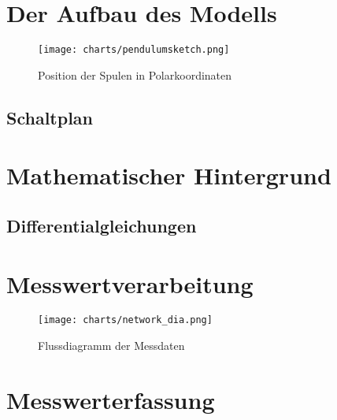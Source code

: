\documentclass[a4paper]{article}
\title{\mytitle}
\author{\myauthor}
\begin{document}
\maketitle
\begin{abstract}
In unserem Projekt beschäftigen wir uns mit dem Verhalten von chaotischen Doppelpendeln. Wir wollen aus der aktuellen Bewegung eines Doppelpendels den weiteren Bewegungsablauf in einem kurzen Zeitintervall extrapolieren und dann versuchen, diese Bewegung zu beeinflussen.

Hierzu wollen wir zunächst ein Doppelpendel konstruieren, bei dem Daten über den aktuellen Bewegungszustand erfasst werden können. Diese Daten sollen in Echtzeit von einem Computer ausgewertet werden, um laufend eine Prognose an die Messwerte anzupassen. Anhand dieser Prognose soll dann entschieden werden, ob das Pendel eine unerwünschte Bewegung durchführen wird, und wenn nötig, soll mithilfe mehrerer Spulen eine korrigierende magnetische Kraft erzeugt werden. Es könnte zum Beispiel erwünscht sein, einen Überschlag zu vermeiden.
\end{abstract}

\newpage

\section{Der Aufbau des Modells}
\begin{figure}
  \texttt{[image: charts/pendulumsketch.png]}
  \caption{Position der Spulen in Polarkoordinaten}
  \label{fig:pendulumsketch}
\end{figure}
\subsection{Schaltplan}

\section{Mathematischer Hintergrund}
\subsection{Differentialgleichungen}

\section{Messwertverarbeitung}
\begin{figure}
  \texttt{[image: charts/network\_dia.png]}
  \caption{Flussdiagramm der Messdaten}
  \label{fig:network}
\end{figure}

%

\newpage
\section{Messwerterfassung}

\end{document}
